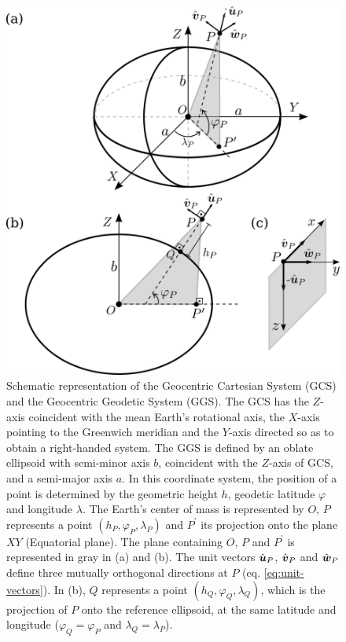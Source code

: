 \documentclass[extra]{gji}
\newcommand{\versor}[1]{\hat{\mitbf{#1}}}
\begin{document}
\begin{figure}
    \includegraphics{figures/cartesian-geodetic-systems.png}
    \caption{Schematic representation of the Geocentric Cartesian System (GCS) and the Geocentric Geodetic System (GGS). The GCS has the $Z$-axis coincident with the mean Earth's rotational axis,
    the $X$-axis pointing to the Greenwich meridian and the $Y$-axis
    directed so as to obtain a right-handed system. The GGS is      defined by an oblate ellipsoid with semi-minor axis $b$,
    coincident with the $Z$-axis of GCS, and a semi-major
    axis $a$. In this coordinate system, the position of a point is
    determined by the geometric height $h$, geodetic latitude
    $\varphi$ and longitude $\lambda$.
    The Earth's center of mass is represented
    by $O$, $P$ represents a point $(h_{P}, \varphi_{P}, \lambda_{P})$ and $P^{\prime}$ its projection onto the plane $XY$
    (Equatorial plane). The plane containing $O$, $P$ and
    $P^{\prime}$ is represented in gray in (a) and (b).
    The unit vectors $\versor{u}_{P}$, $\versor{v}_{P}$ and
    $\versor{w}_{P}$ define three mutually orthogonal
    directions at $P$ (eq. \ref{eq:unit-vectors}).
    In (b), $Q$ represents a point $(h_{Q}, \varphi_{Q}, \lambda_{Q})$,
    which is the projection of $P$ onto the reference ellipsoid, at
    the same latitude and longitude ($\varphi_{Q} = \varphi_{P}$ and $\lambda_{Q} = \lambda_{P}$).}
  \label{fig:GCS-GGS}
\end{figure}
\end{document}

